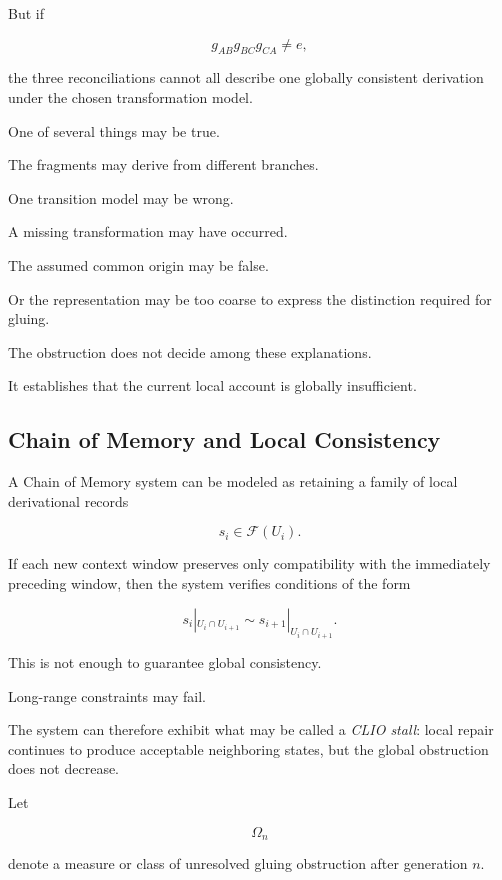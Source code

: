 \documentclass[
  11pt,
  a4paper,
  DIV=12,
  BCOR=0mm,
  parskip=half-
]{scrartcl}
\theoremstyle{definition}
\theoremstyle{plain}
\theoremstyle{remark}
\begin{document}
But if

\[
  g_{AB}g_{BC}g_{CA}\neq e,
\]

the three reconciliations cannot all describe one globally consistent
derivation under the chosen transformation model.

One of several things may be true.

The fragments may derive from different branches.

One transition model may be wrong.

A missing transformation may have occurred.

The assumed common origin may be false.

Or the representation may be too coarse to express the distinction required
for gluing.

The obstruction does not decide among these explanations.

It establishes that the current local account is globally insufficient.


\subsection{Chain of Memory and Local Consistency}
\label{app:com-gluing}

A Chain of Memory system can be modeled as retaining a family of local
derivational records

\[
  s_i\in\mathscr F(U_i).
\]

If each new context window preserves only compatibility with the immediately
preceding window, then the system verifies conditions of the form

\[
  s_i|_{U_i\cap U_{i+1}}
  \sim
  s_{i+1}|_{U_i\cap U_{i+1}}.
\]

This is not enough to guarantee global consistency.

Long-range constraints may fail.

The system can therefore exhibit what may be called a \emph{CLIO stall}: local
repair continues to produce acceptable neighboring states, but the global
obstruction does not decrease.

Let

\[
  \Omega_n
\]

denote a measure or class of unresolved gluing obstruction after generation
\(n\).
\end{document}

